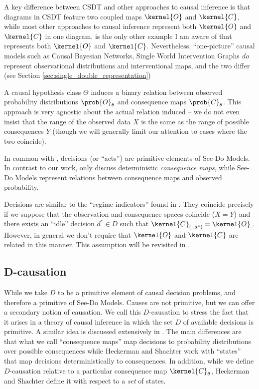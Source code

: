 A key difference between CSDT and other approaches to causal inference is that diagrams in CSDT feature two coupled maps $\kernel{O}$ and $\kernel{C}$, while most other approaches to causal inference represent both $\kernel{O}$ and $\kernel{C}$ in one diagram. \citet{lattimore_replacing_2019} is the only other example I am aware of that represents both $\kernel{O}$ and $\kernel{C}$. Nevertheless, ``one-picture'' causal models such as Causal Bayesian Networks, Single World Intervention Graphs \emph{do} represent observational distributions and interventional maps, and the two differ (see Section \ref{sec:single_double_representation})

A causal hypothesis class $\Theta$ induces a binary relation between observed probability distributions $\prob{O}_\theta$ and consequence maps $\prob{C}_\theta$. This approach is very agnostic about the actual relation induced -- we do not even insist that the range of the observed data $X$ is the same as the range of possible consequences $Y$ (though we will generally limit our attention to cases where the two coincide). 

In common with \citet{heckerman_decision-theoretic_1995}, decisions (or ``acts'') are primitive elements of See-Do Models. In contrast to our work, \citet{heckerman_decision-theoretic_1995} only discuss deterministic \emph{consequence maps}, while See-Do Models represent relations between consequence maps and observed probability.

Decisions are similar to the ``regime indicators'' found in \citet{dawid_decision-theoretic_2020}. They coincide precisely if we suppose that the observation and consequence spaces coincide ($X=Y$) and there exists an ``idle'' decision $d^*\in D$ such that $\kernel{C}_{(\cdot,d^*)} = \kernel{O}_{\cdot}$. However, in general we don't require that $\kernel{O}$ and $\kernel{C}$ are related in this manner. This assumption will be revisited in .

\subsection{D-causation}

While we take $D$ to be a primitive element of causal decision problems, and therefore a primitive of See-Do Models. Causes are not primitive, but we can offer a secondary notion of causation. We call this $D$-causation to stress the fact that it arises in a theory of causal inference in which the set $D$ of available decisions is primitive. A similar idea is discussed extensively in \citet{heckerman_decision-theoretic_1995}. The main differences are that what we call ``consequence maps'' map decisions to probability distributions over possible consequences while Heckerman and Shachter work with ``states'' that map decisions deterministically to consequences. In addition, while we define $D$-causation relative to a particular consequence map $\kernel{C}_\theta$, Heckerman and Shachter define it with respect to a \emph{set} of states.

